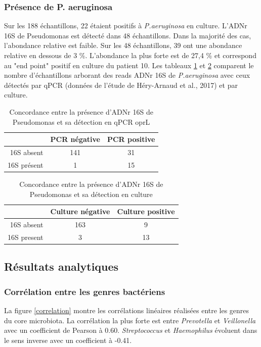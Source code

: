 \documentclass[12pt,a4paper]{article}
\begin{document}
\subsubsection{Présence de P. aeruginosa}
Sur les 188 échantillons, 22 étaient positifs à \textit{P.aeruginosa} en culture. L'ADNr 16S de Pseudomonas est détecté dans 48 échantillons. Dans la majorité des cas, l'abondance relative est faible. Sur les 48 échantillons, 39 ont une abondance relative en dessous de 3 \%. L'abondance la plus forte est de 27,4 \% et correspond au "end point" positif en culture du patient 10.
Les tableaux \ref{pyopcr} et \ref{pyoculture} comparent le nombre d'échantillons arborant des reads ADNr 16S de \textit{P.aeruginosa} avec ceux détectés par qPCR (données de l'étude de Héry-Arnaud et al., 2017) et par culture.

  \begin{table}[!h]
      \centering
      \begin{tabular}{r|c|c}
           & PCR négative  & PCR positive \\
           \hline
           16S absent & 141 & 31 \\
           16S présent & 1 & 15   \\

      \end{tabular}
      \caption{Concordance entre la présence d'ADNr 16S de Pseudomonas et sa détection en qPCR oprL}
      \label{pyopcr}
  \end{table}

  \begin{table}[!h]
      \centering
      \begin{tabular}{r|c|c}
           & Culture négative  & Culture positive \\
           \hline
           16S absent & 163 & 9 \\
           16S present & 3 & 13   \\
      \end{tabular}
      \caption{Concordance entre la présence d'ADNr 16S de Pseudomonas et sa détection en culture}
      \label{pyoculture}
  \end{table}


\subsection{Résultats analytiques}
\subsubsection{Corrélation entre les genres bactériens}
La figure \ref{correlation} montre les corrélations linéaires réalisées entre les genres du core microbiota. La corrélation la plus forte est entre \textit{Prevotella} et \textit{Veillonella} avec un coefficient de Pearson à 0.60.  \textit{Streptococcus} et \textit{Haemophilus} évoluent dans le sens inverse avec un coefficient à -0.41.
\end{document}
